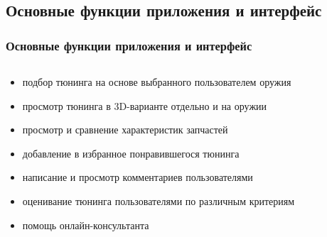 \documentclass[10pt,utf8,presentation,notheorems,xcolor=dvipsnames,compress]{beamer}
\begin{document}
\subsection{Основные функции приложения и интерфейс}
\begin{frame}
\frametitle{Основные функции приложения и интерфейс}
\vskip -0.35cm
  \begin{columns}[T]
    \begin{column}{.65\textwidth}
     \begin{block}{}
\begin{itemize}
\item подбор тюнинга на основе выбранного пользователем оружия
\item просмотр тюнинга в 3D-варианте отдельно и на оружии
\item просмотр и сравнение характеристик запчастей
\item добавление в избранное понравившегося тюнинга
\item написание и просмотр комментариев пользователями
\item оценивание тюнинга пользователями по различным критериям
\item помощь онлайн-консультанта
\end{itemize}
    \end{block}
    \end{column}
    \begin{column}{.25\textwidth}
    \begin{block}{}

\end{block}
\end{column}
\end{columns}
\end{frame}
\end{document}
